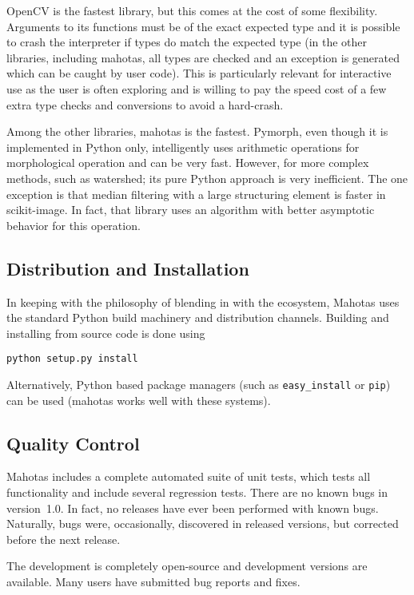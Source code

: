 \documentclass{scrartcl}
\begin{document}
OpenCV is the fastest library, but this comes at the cost of some flexibility.
Arguments to its functions must be of the exact expected type and it is
possible to crash the interpreter if types do match the expected type (in the
other libraries, including mahotas, all types are checked and an exception is
generated which can be caught by user code). This is particularly relevant for
interactive use as the user is often exploring and is willing to pay the speed
cost of a few extra type checks and conversions to avoid a hard-crash.

Among the other libraries, mahotas is the fastest. Pymorph, even though it is
implemented in Python only, intelligently uses arithmetic operations for
morphological operation and can be very fast. However, for more complex
methods, such as watershed; its pure Python approach is very inefficient. The
one exception is that median filtering with a large structuring element is
faster in scikit-image. In fact, that library uses an algorithm with better
asymptotic behavior for this operation.

\subsection{Distribution and Installation}

In keeping with the philosophy of blending in with the ecosystem, Mahotas uses
the standard Python build machinery and distribution channels. Building and
installing from source code is done using
\begin{verbatim}
python setup.py install
\end{verbatim}
Alternatively, Python based package managers (such as \texttt{easy\_install} or
\texttt{pip}) can be used (mahotas works well with these systems).

\subsection{Quality Control}

Mahotas includes a complete automated suite of unit tests, which tests all
functionality and include several regression tests. There are no known bugs in
version~1.0. In fact, no releases have ever been performed with known bugs.
Naturally, bugs were, occasionally, discovered in released versions, but
corrected before the next release.

The development is completely open-source and development versions are
available. Many users have submitted bug reports and fixes.
\end{document}
